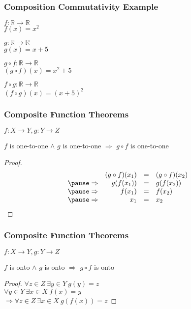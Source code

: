 \documentclass[dvipsnames]{beamer}
\begin{document}
\begin{frame}
  \frametitle{Composition Commutativity Example}

  $f: \mathbb{R} \rightarrow \mathbb{R}$\\
  $f(x) = x^2$

  \medskip
  $g: \mathbb{R} \rightarrow \mathbb{R}$\\
  $g(x) = x + 5$

  \pause
  \bigskip
  $g \circ f: \mathbb{R} \rightarrow \mathbb{R}$\\
  $(g \circ f)(x) = x^2 + 5$

  \pause
  \medskip
  $f \circ g: \mathbb{R} \rightarrow \mathbb{R}$\\
  $(f \circ g)(x) = (x + 5)^2$
\end{frame}

\begin{frame}
  \frametitle{Composite Function Theorems}

  \begin{theorem}
    $f: X \rightarrow Y, g: Y \rightarrow Z$

    $f$ is one-to-one $\wedge$ $g$ is one-to-one
      $\Rightarrow$ $g \circ f$ is one-to-one
  \end{theorem}

  \pause
  \begin{proof}
    \[
      \begin{array}{crcl}
                  & (g \circ f) (x_1) & = & (g \circ f) (x_2)\\\pause
      \Rightarrow & g(f(x_1))         & = & g(f(x_2))\\\pause
      \Rightarrow & f(x_1)            & = & f(x_2)\\\pause
      \Rightarrow & x_1               & = & x_2
      \end{array}
    \]
  \end{proof}
\end{frame}

\begin{frame}
  \frametitle{Composite Function Theorems}

  \begin{theorem}
    $f: X \rightarrow Y, g: Y \rightarrow Z$

    $f$ is onto $\wedge$ $g$ is onto $\Rightarrow$ $g \circ f$ is onto
  \end{theorem}

  \pause
  \begin{proof}
    $\forall z \in Z~\exists y \in Y~g(y) = z$\\\pause
    $\forall y \in Y~\exists x \in X~f(x) = y$\\\pause
      $\Rightarrow \forall z \in Z~\exists x \in X~g(f(x)) = z$
  \end{proof}
\end{frame}
\end{document}
